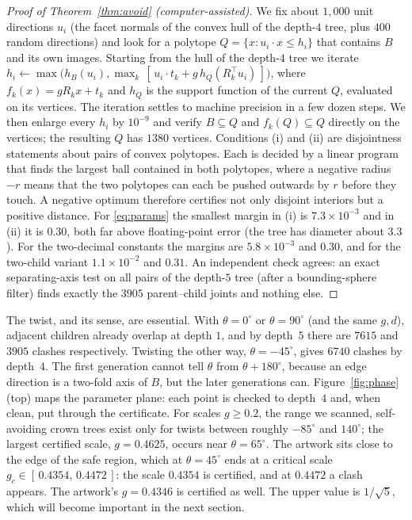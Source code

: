 \documentclass[11pt,a4paper]{article}
\theoremstyle{definition}
\theoremstyle{remark}
\newcommand{\GCLO}{0.4354}
\newcommand{\GCHI}{0.4472}
\begin{document}
\begin{proof}[Proof of Theorem~\ref{thm:avoid} (computer-assisted)]
We fix about $1{,}000$ unit directions $u_i$ (the facet normals of the convex
hull of the depth-$4$ tree, plus $400$ random directions) and look for a
polytope $Q=\{x: u_i\cdot x\le h_i\}$ that contains $B$ and its own images.
Starting from the hull of the depth-$4$ tree we iterate
$h_i\leftarrow\max\bigl(h_B(u_i),\max_k\,[\,u_i\cdot t_k+g\,h_Q(R_k^{\top}u_i)\,]\bigr)$,
where $f_k(x)=gR_kx+t_k$ and $h_Q$ is the support function of the current
$Q$, evaluated on its vertices.  The iteration settles to machine precision in
a few dozen steps.  We then enlarge every $h_i$ by $10^{-9}$ and verify
$B\subseteq Q$ and $f_k(Q)\subseteq Q$ directly on the vertices; the resulting
$Q$ has $1380$ vertices.  Conditions (i) and (ii) are disjointness statements
about pairs of convex polytopes.  Each is decided by a linear program that
finds the largest ball contained in both polytopes, where a negative radius
$-r$ means that the two polytopes can each be pushed outwards by $r$ before
they touch.  A negative optimum therefore certifies not only disjoint
interiors but a positive distance.  For \eqref{eq:params} the smallest margin
in (i) is $7.3\times10^{-3}$ and in (ii) it is $0.30$, both far above
floating-point error (the tree has diameter about $3.3$).  For the two-decimal
constants the margins are $5.8\times10^{-3}$ and $0.30$, and for the two-child
variant $1.1\times10^{-2}$ and $0.31$.  An independent check agrees: an exact
separating-axis test on all pairs of the depth-$5$ tree (after a
bounding-sphere filter) finds exactly the $3905$ parent--child joints and
nothing else.
\end{proof}

The twist, and its sense, are essential.  With $\theta=0^\circ$ or
$\theta=90^\circ$ (and the same $g,d$), adjacent children already overlap at
depth $1$, and by depth~$5$ there are $7615$ and $3905$ clashes respectively.
Twisting the other way, $\theta=-45^\circ$, gives $6740$ clashes by depth~$4$.
The first generation cannot tell $\theta$ from $\theta+180^\circ$, because an
edge direction is a two-fold axis of $B$, but the later generations can.
Figure~\ref{fig:phase} (top) maps the parameter plane: each point is checked to
depth~$4$ and, when clean, put through the certificate.  For scales
$g\ge0.2$, the range we scanned, self-avoiding crown trees exist only for
twists between roughly $-85^\circ$ and $140^\circ$; the largest certified
scale, $g=0.4625$, occurs near $\theta=65^\circ$.  The artwork sits close to
the edge of the safe region, which at $\theta=45^\circ$ ends at a critical
scale $g_c\in[\,\GCLO,\,\GCHI\,]$: the scale $\GCLO$ is certified, and at
$\GCHI$ a clash appears.  The artwork's $g=0.4346$ is certified as well.  The
upper value is $1/\sqrt5$, which will become important in the next section.
\end{document}
